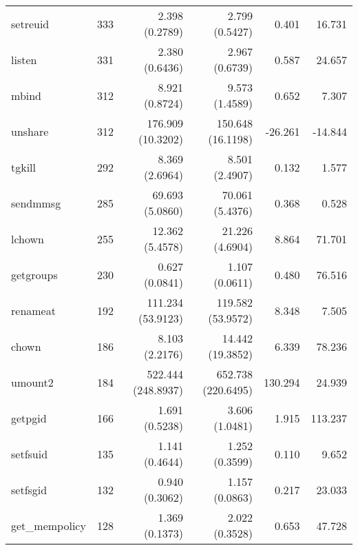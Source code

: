 \begin{longtable}{>{\ttfamily}lrrrrr}
                       setreuid &        333 &           2.398 (0.2789) &           2.799 (0.5427) &           0.401 &       16.731 \\
                         listen &        331 &           2.380 (0.6436) &           2.967 (0.6739) &           0.587 &       24.657 \\
                          mbind &        312 &           8.921 (0.8724) &           9.573 (1.4589) &           0.652 &        7.307 \\
                        unshare &        312 &        176.909 (10.3202) &        150.648 (16.1198) &         -26.261 &      -14.844 \\
                         tgkill &        292 &           8.369 (2.6964) &           8.501 (2.4907) &           0.132 &        1.577 \\
                       sendmmsg &        285 &          69.693 (5.0860) &          70.061 (5.4376) &           0.368 &        0.528 \\
                         lchown &        255 &          12.362 (5.4578) &          21.226 (4.6904) &           8.864 &       71.701 \\
                      getgroups &        230 &           0.627 (0.0841) &           1.107 (0.0611) &           0.480 &       76.516 \\
                       renameat &        192 &        111.234 (53.9123) &        119.582 (53.9572) &           8.348 &        7.505 \\
                          chown &        186 &           8.103 (2.2176) &         14.442 (19.3852) &           6.339 &       78.236 \\
                        umount2 &        184 &       522.444 (248.8937) &       652.738 (220.6495) &         130.294 &       24.939 \\
                        getpgid &        166 &           1.691 (0.5238) &           3.606 (1.0481) &           1.915 &      113.237 \\
                       setfsuid &        135 &           1.141 (0.4644) &           1.252 (0.3599) &           0.110 &        9.652 \\
                       setfsgid &        132 &           0.940 (0.3062) &           1.157 (0.0863) &           0.217 &       23.033 \\
                 get\_mempolicy &        128 &           1.369 (0.1373) &           2.022 (0.3528) &           0.653 &       47.728 \\

\end{longtable}
